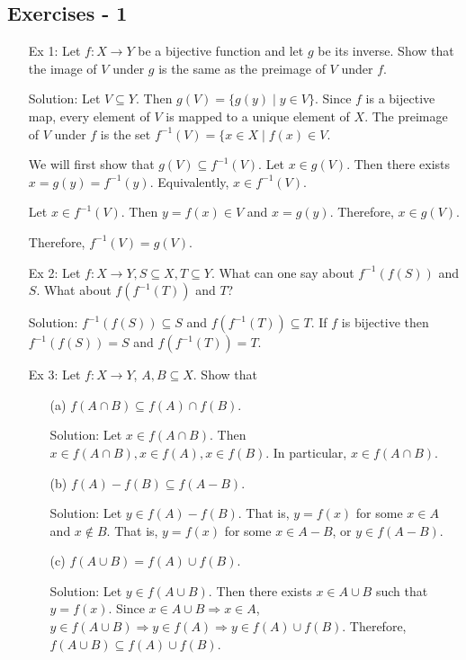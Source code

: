 \subsection{Exercises - 1}
\begin{enumerate}
\item[Ex 1:] Let $f: X \rightarrow Y$ be a bijective function and let 
$g$ be its inverse. Show that the image of $V$ under $g$ is the same as 
the preimage of $V$ under $f$.
\item[Solution:] Let $V \subseteq Y$. Then $g(V) = \{g(y) \;|\; y \in V\}$.
Since $f$ is a bijective map, every element of $V$ is mapped to a unique
element of $X$. The preimage of $V$ under $f$ is the set $f^{-1}(V) = \{x
\in X \;|\; f(x) \in V$.

We will first show that $g(V) \subseteq f^{-1}(V)$. Let $x \in g(V)$. Then
there exists $x = g(y) = f^{-1}(y)$. Equivalently, $x \in f^{-1}(V)$.

Let $x \in f^{-1}(V)$. Then $y = f(x) \in V$ and $x = g(y)$. Therefore,
$x \in g(V)$.

Therefore, $f^{-1}(V) = g(V)$.

\item[Ex 2:] Let $f: X \rightarrow Y, S \subseteq X, T \subseteq Y$. What
can one say about $f^{-1}(f(S))$ and $S$. What about $f(f^{-1}(T))$ and 
$T$?
\item[Solution:] $f^{-1}(f(S)) \subseteq S$ and $f(f^{-1}(T)) \subseteq T$.
If $f$ is bijective then $f^{-1}(f(S)) = S$ and $f(f^{-1}(T)) = T$.

\item[Ex 3:] Let $f: X \rightarrow Y$, $A, B \subseteq X$. Show that
\begin{enumerate}
\item[(a)] $f(A \cap B) \subseteq f(A) \cap f(B)$.
\item[Solution:] Let $x \in f(A \cap B)$. Then $x \in f(A \cap B), x \in
f(A), x \in f(B)$. In particular, $x \in f(A \cap B)$.

\item[(b)] $f(A) - f(B) \subseteq f(A - B)$.
\item[Solution:] Let $y \in f(A) - f(B)$. That is, $y = f(x)$ for some $x
\in A$ and $x \notin B$. That is, $y = f(x)$ for some $x \in A - B$, or
$y \in f(A - B)$.

\item[(c)] $f(A \cup B) = f(A) \cup f(B)$.
\item[Solution:] Let $y \in f(A \cup B)$. Then there exists $x \in A \cup
B$ such that $y = f(x)$. Since $x \in A \cup B \Rightarrow x \in A$, $y \in
f(A \cup B) \Rightarrow y \in f(A) \Rightarrow y \in f(A) \cup f(B)$.
Therefore, $f(A \cup B) \subseteq f(A) \cup f(B)$.


\end{enumerate}
\end{enumerate}
